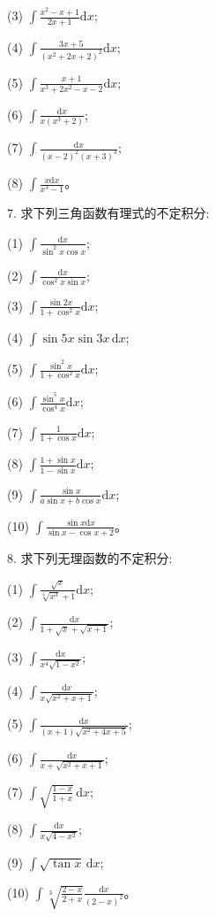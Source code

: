 \documentclass[UTF8,12pt,a4paper,fontset=fandol]{ctexart}
\begin{document}
(3) $\displaystyle \int\frac{x^2-x+1}{2x+1}\mathrm dx$;

(4) $\displaystyle \int\frac{3x+5}{(x^2+2x+2)^2}\mathrm dx$;

(5) $\displaystyle \int\frac{x+1}{x^3+2x^2-x-2}\mathrm dx$;

(6) $\displaystyle \int\frac{\mathrm dx}{x(x^3+2)}$;

(7) $\displaystyle \int\frac{\mathrm dx}{(x-2)^2(x+3)^3}$;

(8) $\displaystyle \int\frac{x\mathrm dx}{x^3-1}$。

7. 求下列三角函数有理式的不定积分:

(1) $\displaystyle \int\frac{\mathrm dx}{\sin^2x\cos x}$;

(2) $\displaystyle \int\frac{\mathrm dx}{\cos^2x\sin x}$;

(3) $\displaystyle \int\frac{\sin2x}{1+\cos^2x}\mathrm dx$;

(4) $\displaystyle \int\sin5x\sin3x\,\mathrm dx$;

(5) $\displaystyle \int\frac{\sin^2x}{1+\cos^2x}\mathrm dx$;

(6) $\displaystyle \int\frac{\sin^5x}{\cos^4x}\mathrm dx$;

(7) $\displaystyle \int\frac1{1+\cos x}\mathrm dx$;

(8) $\displaystyle \int\frac{1+\sin x}{1-\sin x}\mathrm dx$;

(9) $\displaystyle \int\frac{\sin x}{a\sin x+b\cos x}\mathrm dx$;

(10) $\displaystyle \int\frac{\sin x\mathrm dx}{\sin x-\cos x+2}$。

8. 求下列无理函数的不定积分:

(1) $\displaystyle \int\frac{\sqrt x}{\sqrt[4]{x^3}+1}\mathrm dx$;

(2) $\displaystyle \int\frac{\mathrm dx}{1+\sqrt x+\sqrt{x+1}}$;

(3) $\displaystyle \int\frac{\mathrm dx}{x^4\sqrt{1-x^2}}$;

(4) $\displaystyle \int\frac{\mathrm dx}{x\sqrt{x^2+x+1}}$;

(5) $\displaystyle \int\frac{\mathrm dx}{(x+1)\sqrt{x^2+4x+5}}$;

(6) $\displaystyle \int\frac{\mathrm dx}{x+\sqrt{x^2+x+1}}$;

(7) $\displaystyle \int\sqrt{\frac{1-x}{1+x}}\,\mathrm dx$;

(8) $\displaystyle \int\frac{\mathrm dx}{x\sqrt{4-x^2}}$;

(9) $\displaystyle \int\sqrt{\tan x}\,\mathrm dx$;

(10) $\displaystyle \int\sqrt[3]{\frac{2-x}{2+x}}\frac{\mathrm dx}{(2-x)^2}$。
\end{document}
